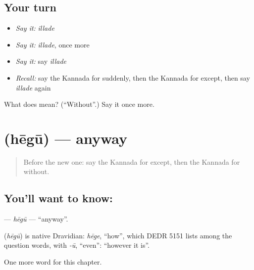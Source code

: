 \subsection*{Your turn}
\begin{itemize}
\raggedright
  \item \emph{Say it:} \emph{illade}
  \item \emph{Say it:} \emph{illade}, once more
  \item \emph{Say it:} say \emph{illade}
  \item \emph{Recall:} say the Kannada for suddenly, then the Kannada for except, then say \emph{illade} again
\end{itemize}

\begin{tcolorbox}[breakable,colback=teal!4,colframe=teal!35!black,title={Before you move on}]
What does  mean? (\textquotedblleft{}Without\textquotedblright{}.) Say it once more.
\end{tcolorbox}
\section[\texorpdfstring{\kn{ಹೇಗೂ} (hēgū)}{ಹೇಗೂ (hēgū)}]{ (hēgū) — anyway}

\label{lesson:KA-C288-hegu}



\begin{quote}
Before the new one: say the Kannada for except, then the Kannada for without.
\end{quote}

\subsection*{You'll want to know: }
\textbf{} — \emph{hēgū} — \textquotedblleft{}anyway\textquotedblright{}.

\begin{cousinweb}
\textbf{} (\emph{hēgū}) is native Dravidian: \emph{hēge}, \textquotedblleft{}how\textquotedblright{}, which DEDR 5151 lists among the question words, with \emph{-ū}, \textquotedblleft{}even\textquotedblright{}: \textquotedblleft{}however it is\textquotedblright{}.
\end{cousinweb}

\begin{grammarlens}[title={What you've built}]
One more word for this chapter.
\end{grammarlens}

